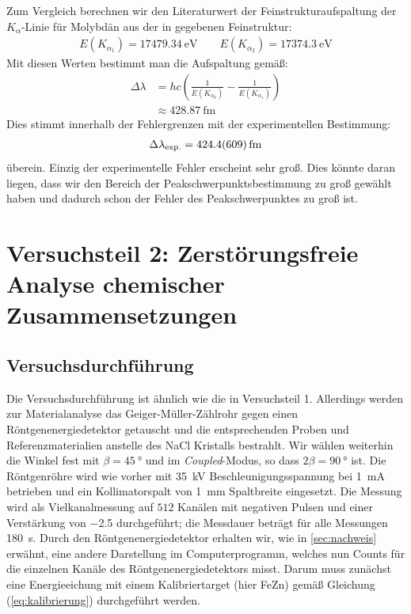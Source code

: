 \documentclass[11pt, a4paper]{article}
\begin{document}
Zum Vergleich berechnen wir den Literaturwert der Feinstrukturaufspaltung der $K_\alpha$-Linie für Molybdän aus der in \cite{booklet} gegebenen Feinstruktur:
\begin{align*}
  E(K_{\alpha_1}) = \SI{17479,34}{\electronvolt} \qquad E(K_{\alpha_2}) = \SI{17374,3}{\electronvolt}
\end{align*}
Mit diesen Werten bestimmt man die Aufspaltung gemäß:
\begin{align*}
  \Delta \lambda &= h c \left( \frac{1}{E(K_{\alpha_2})} - \frac{1}{E(K_{\alpha_1})} \right) \\
  &\approx \SI{428,87}{\femto\metre}
\end{align*}
Dies stimmt innerhalb der Fehlergrenzen mit der experimentellen Bestimmung:
\begin{align*}
  \Delta \lambda_\mathrm{exp.} = \SI{424,4+-60,9}{\femto\metre}
\end{align*}
überein.
Einzig der experimentelle Fehler erscheint sehr groß.
Dies könnte daran liegen, dass wir den Bereich der Peakschwerpunktsbestimmung zu groß gewählt haben und dadurch schon der Fehler des Peakschwerpunktes zu groß ist.


\section{Versuchsteil 2: Zerstörungsfreie Analyse chemischer Zusammensetzungen}

\subsection{Versuchsdurchführung}
Die Versuchsdurchführung ist ähnlich wie die in Versuchsteil 1.
Allerdings werden zur Materialanalyse das Geiger-Müller-Zählrohr gegen einen Röntgenenergiedetektor getauscht und die entsprechenden Proben und Referenzmaterialien anstelle des NaCl Kristalls bestrahlt.
Wir wählen weiterhin die Winkel fest mit $\beta=\SI{45}{\degree}$ und im \emph{Coupled}-Modus, so dass $2\beta=\SI{90}{\degree}$ ist.
Die Röntgenröhre wird wie vorher mit \SI{35}{\kilo\volt} Beschleunigungsspannung bei \SI{1}{\milli\ampere} betrieben und ein Kollimatorspalt von \SI{1}{\milli\metre} Spaltbreite eingesetzt.
Die Messung wird als Vielkanalmessung auf $512$ Kanälen mit negativen Pulsen und einer Verstärkung von \num{-2.5} durchgeführt; die Messdauer beträgt für alle Messungen \SI{180}{\second}.
Durch den Röntgenenergiedetektor erhalten wir, wie in \ref{sec:nachweis} erwähnt, eine andere Darstellung im Computerprogramm, welches nun Counts für die einzelnen Kanäle des Röntgenenergiedetektors misst. Darum muss zunächst eine Energieeichung mit einem Kalibriertarget (hier FeZn) gemäß Gleichung (\ref{eq:kalibrierung}) durchgeführt werden.
\end{document}
